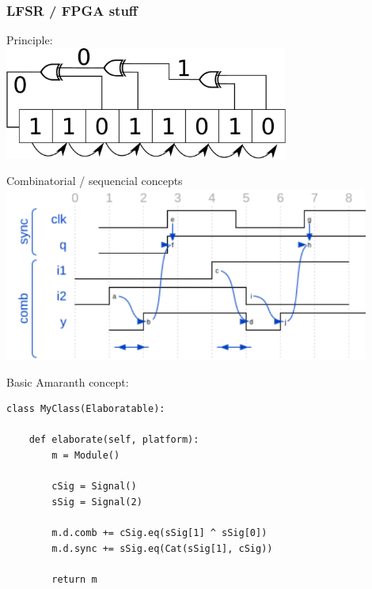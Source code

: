 \documentclass[compress,10pt,aspectratio=169]{beamer}
\begin{document}
\begin{frame}\frametitle{LFSR / FPGA stuff}

\begin{minipage}[t]{\linewidth}
\begin{minipage}{.5\linewidth}
Principle:\\
\hspace{1cm}\includegraphics[width=0.7\textwidth]{lfsr_scheme.pdf}

Combinatorial / sequencial concepts\\
\includegraphics[width=0.9\textwidth]{behav.pdf}
\end{minipage}
\begin{minipage}{.5\linewidth}

Basic Amaranth concept:

{\small
\begin{verbatim}
class MyClass(Elaboratable):

    def elaborate(self, platform):
        m = Module()
        
        cSig = Signal()
        sSig = Signal(2)
        
        m.d.comb += cSig.eq(sSig[1] ^ sSig[0])
        m.d.sync += sSig.eq(Cat(sSig[1], cSig))
        
        return m
\end{verbatim}
}

\end{minipage}
\end{minipage}

\vspace{0.5cm}
\hspace{0.5cm}{\footnotesize
amaranth $\rightarrow$ verilog $\rightarrow$ synthesis (yosys, Vivado, ...)
$\rightarrow$ PnR (nextpnr, vtr, vivado, ...)
$\rightarrow$ bitstream $\rightarrow$ programmer
}
\end{frame}
\end{document}
